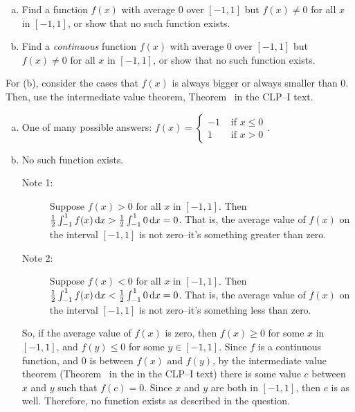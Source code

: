 \begin{Mquestion}
\begin{enumerate}[(a)]
\item Find a function $f(x)$ with average $0$ over $[-1,1]$ but $f(x) \neq 0$ for all $x$ in $[-1,1]$, or show that no such function exists.
\item Find a \emph{continuous} function $f(x)$ with average $0$ over $[-1,1]$ but $f(x) \neq 0$ for all $x$ in $[-1,1]$, or show that no such function exists.
\end{enumerate}
\end{Mquestion}
\begin{hint}
For (b), consider the cases that $f(x)$ is always bigger or always smaller than 0. Then, use the intermediate value theorem, Theorem~ in the CLP--I text.
\end{hint}
\begin{answer}
\begin{enumerate}[(a)]
\item One of many possible answers: $f(x) = \begin{cases}
-1&\text{ if } x \leq 0\\
1&\text{ if } x > 0
\end{cases}$.
\item No such function exists.
\begin{description}
\item[Note 1:] Suppose $f(x)>0$ for all $x$ in $[-1,1]$. Then $\frac{1}{2}\int_{-1}^1f(x)\,\mathrm{d}x > \frac{1}{2}\int_{-1}^10\,\mathrm{d}x =0 $. That is, the average value of $f(x)$ on the interval $[-1,1]$ is not zero--it's something greater than zero.
\item[Note 2:] Suppose $f(x)<0$ for all $x$ in $[-1,1]$. Then $\frac{1}{2}\int_{-1}^1f(x)\,\mathrm{d}x < \frac{1}{2}\int_{-1}^10\,\mathrm{d}x =0 $. That is, the average value of $f(x)$ on the interval $[-1,1]$ is not zero--it's something less than zero.
\end{description}
So, if the average value of $f(x)$ is zero, then $f(x)\ge 0$ for some $x$ in $[-1,1]$, and $f(y) \le 0$ for some $y \in [-1,1]$. Since $f$ is a continuous function, and 0 is between $f(x)$ and $f(y)$, by the intermediate value theorem (Theorem~ in the  in the CLP--I text) there is some value $c$ between $x$ and $y$ such that $f(c)=0$. Since $x$ and $y$ are both in $[-1,1]$, then $c$ is as well. Therefore, no function exists as described in the question.
\end{enumerate}
\end{answer}
